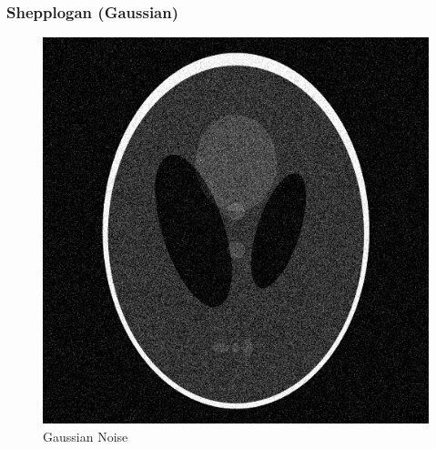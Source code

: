 \documentclass{article}
\begin{document}
    \subsubsection*{Shepplogan (Gaussian)}
    
    \begin{figure}[!htb]
    \begin{center}
     \includegraphics[scale=.3]{./basic_denoising/shepplogan/gaussian.png}
     \caption{Gaussian Noise}
    \end{center}
    \end{figure}
    
\end{document}
